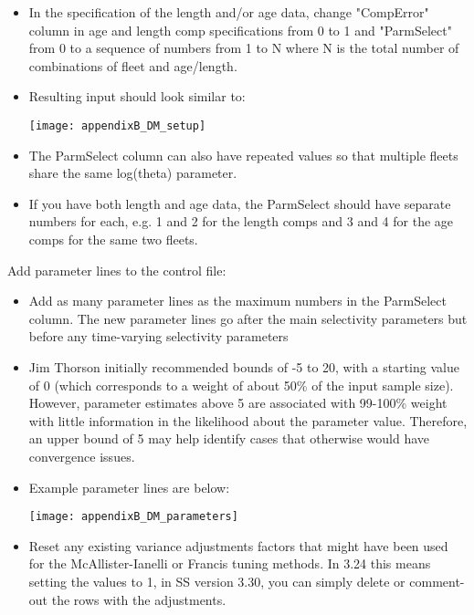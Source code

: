 \begin{itemize}
	\item In the specification of the length and/or age data, change "CompError" column in age and length comp specifications from 0 to 1 and "ParmSelect" from 0 to a sequence of numbers from 1 to N where N is the total number of combinations of fleet and age/length.
	
	\item Resulting input should look similar to:
	\begin{center}
		\texttt{[image: appendixB\_DM\_setup]}\\
	\end{center}
	
	\item The ParmSelect column can also have repeated values so that multiple fleets share the same log(theta) parameter.
	
	\item If you have both length and age data, the ParmSelect should have separate numbers for each, e.g. 1 and 2 for the length comps and 3 and 4 for the age comps for the same two fleets.
	
\end{itemize}

Add parameter lines to the control file:

\begin{itemize}
	\item Add as many parameter lines as the maximum numbers in the ParmSelect column. The new parameter lines go after the main selectivity parameters but before any time-varying selectivity parameters
	
	\item Jim Thorson initially recommended bounds of -5 to 20, with a starting value of 0
	(which corresponds to a weight of about 50\% of the input sample size). However, parameter estimates above 5 are associated with 99-100\% weight with little information in the likelihood about the parameter value. Therefore, an upper bound of 5 may help identify cases that otherwise would have convergence issues.
	
	\item Example parameter lines are below: 
		\begin{center}
			\texttt{[image: appendixB\_DM\_parameters]}\\
		\end{center}
	
	\item Reset any existing variance adjustments factors that might have been used for the McAllister-Ianelli or Francis tuning methods. In 3.24 this means setting the values to 1, in SS version 3.30, you can simply delete or comment-out the rows with the adjustments.
\end{itemize}

